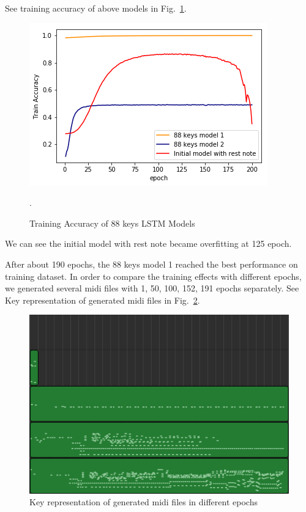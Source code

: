 \documentclass[conference]{IEEEtran}
\begin{document}
See training accuracy of above models in Fig.~\ref{fig3}.
\begin{figure}[htbp]
\centerline{\includegraphics[scale=0.5]{pics/compare3.png}}.
\caption{Training Accuracy of 88 keys LSTM Models}
\label{fig3}
\end{figure}

We can see the initial model with rest note became overfitting at 125 epoch.

After about 190 epochs, the 88 keys model 1 reached the best performance on training dataset.
In order to compare the training effects with different epochs, we generated several midi files with 1, 50, 100, 152, 191 epochs separately. See Key representation of generated midi files in Fig.~\ref{fig4}.

\begin{figure}[htbp]
\centerline{\includegraphics[scale=0.45]{compare_results.png}}
\caption{Key representation of generated midi files in different epochs\protect\footnotemark}
\label{fig4}
\end{figure}
\end{document}
